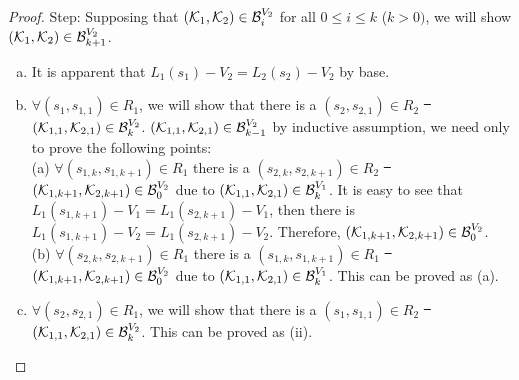 \documentclass{article}
\begin{document}
\begin{proof}
Step: Supposing that $({\cal K}_1, {\cal K}_2) \in {\cal B}_i^{V_2}$ for all $0 \leq i \leq k$ ($k > 0)$, we will show $({\cal K}_1, {\cal K}_2) \in {\cal B}_{k+1}^{V_2}$.
\begin{enumerate} [(a)]
  \item It is apparent that $L_1(s_1) - V_2 = L_2(s_2) - V_2$ by base.
  \item $\forall (s_1, s_{1,1}) \in R_1$, we will show that there is a $(s_2, s_{2, 1}) \in R_2$ \st\ $({\cal K}_{1,1}, {\cal K}_{2,1})\in {\cal B}_k^{V_2}$. $({\cal K}_{1,1}, {\cal K}_{2,1})\in {\cal B}_{k-1}^{V_2}$ by inductive assumption, we need only to prove the following points:\\
      (a) $\forall (s_{1, k}, s_{1, k+1}) \in R_1$ there is a $(s_{2, k}, s_{2, k+1})\in R_2$ \st\ $({\cal K}_{1,k+1}, {\cal K}_{2,k+1})\in {\cal B}_0^{V_2}$ due to $({\cal K}_{1,1}, {\cal K}_{2,1})\in {\cal B}_{k}^{V_1}$. It is easy to see that $L_1(s_{1, k+1}) - V_1 = L_1(s_{2, k+1}) - V_1$, then there is $L_1(s_{1, k+1})- V_2 = L_1(s_{2, k+1}) - V_2$. Therefore, $({\cal K}_{1,k+1}, {\cal K}_{2,k+1})\in {\cal B}_0^{V_2}$.\\
      (b) $\forall (s_{2, k}, s_{2, k+1}) \in R_1$ there is a $(s_{1, k}, s_{1, k+1}) \in R_1$ \st\ $({\cal K}_{1,k+1}, {\cal K}_{2,k+1})\in {\cal B}_0^{V_2}$ due to $({\cal K}_{1,1}, {\cal K}_{2,1})\in {\cal B}_{k}^{V_1}$. This can be proved as (a).
  \item $\forall (s_2, s_{2,1}) \in R_1$, we will show that there is a $(s_1, s_{1, 1}) \in R_2$ \st\ $({\cal K}_{1,1}, {\cal K}_{2,1})\in {\cal B}_k^{V_2}$. This can be proved as (ii).
\end{enumerate}

\end{proof}

\end{document}
